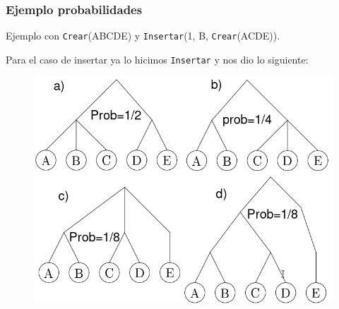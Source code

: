 \documentclass[10pt,handout]{beamer}
\begin{document}
\section{}
\begin{frame}
\frametitle{Ejemplo probabilidades}

Ejemplo con \texttt{Crear}(ABCDE) y \texttt{Insertar}(1, B, \texttt{Crear}(ACDE)).

Para el caso de insertar ya lo hicimos \texttt{Insertar} y nos dio lo siguiente:

\begin{figure}[h!]
    \centering
    \includegraphics[scale=0.3]{insertCreateRes.jpg}
\end{figure}

\end{frame}

\end{document}

